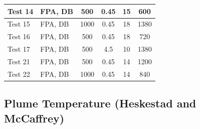 \begin{table}[!ht]
\begin{center}
\begin{tabular}{|l|l|c|c|c|c|}
Test 14    &  FPA, DB           &  500            &  0.45           &  15                    &  600               \\ \hline
Test 15    &  FPA, DB           &  1000           &  0.45           &  18                    &  1380              \\ \hline
Test 16    &  FPA, DB           &  500            &  0.45           &  18                    &  720               \\ \hline
Test 17    &  FPA, DB           &  500            &  4.5            &  10                    &  1380              \\ \hline
Test 21    &  FPA, DB           &  500            &  0.45           &  14                    &  1200              \\ \hline
Test 22    &  FPA, DB           &  1000           &  0.45           &  14                    &  840               \\ \hline
\end{tabular}
\end{center}
\end{table}


\clearpage


\subsection*{Plume Temperature (Heskestad and McCaffrey)~\cite{SFPE:Heskestad, McCaffrey:NBSIR_79-1910}}

